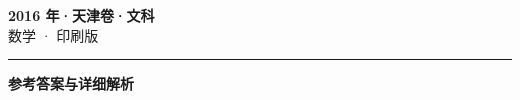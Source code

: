 \documentclass[zihao=5, a4paper]{ctexart}
\begin{document}
\begin{center}
  {\Large\bfseries 2016 年·天津卷·文科}\\[4pt]
  {\large 数学 · 印刷版}
\end{center}
\medskip
{}

\par\bigskip\hrule\bigskip
{}
\begin{center}{\large\bfseries 参考答案与详细解析}\end{center}
\smallskip

\end{document}
